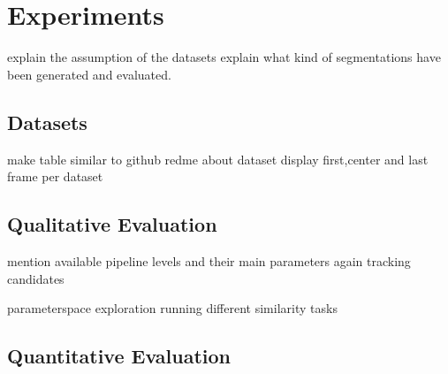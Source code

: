 \chapter{Experiments}
explain the assumption of the datasets
explain what kind of segmentations have been generated and evaluated.

\section{Datasets}
\label{sec:datasets}
make table similar to github redme about dataset
display first,center and last frame per dataset

\section{Qualitative Evaluation}
mention available pipeline levels and their main parameters again
tracking candidates



parameterspace exploration
running different similarity tasks



\section{Quantitative Evaluation}
